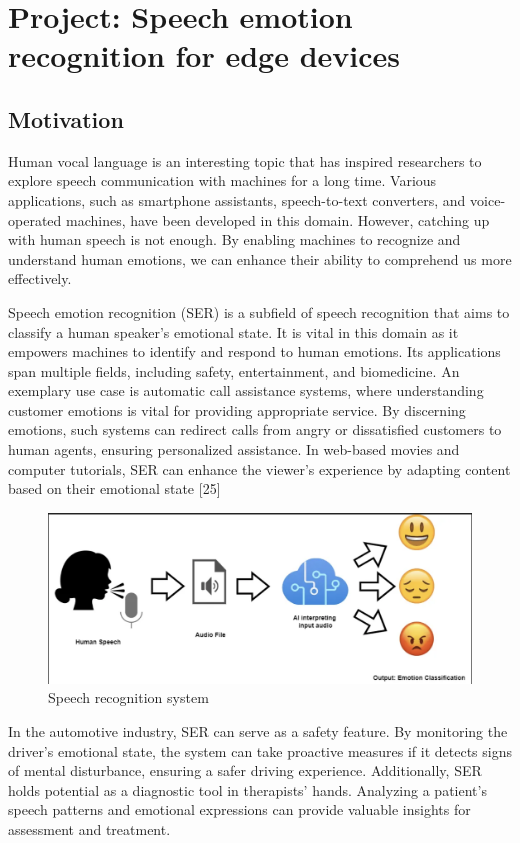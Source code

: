 \section{Project: Speech emotion recognition for edge devices}
\subsection{Motivation}
Human vocal language is an interesting topic that has inspired researchers to explore speech communication with machines for a long time. Various applications, such as smartphone assistants, speech-to-text converters, and voice-operated machines, have been developed in this domain.
However, catching up with human speech is not enough. By enabling machines to recognize and understand human emotions, we can enhance their ability to comprehend us more effectively.

Speech emotion recognition (SER) is a subfield of speech recognition that aims to classify a human speaker's emotional state. It is vital in this domain as it empowers machines to identify and respond to human emotions. Its applications span multiple fields, including safety, entertainment, and biomedicine. 
An exemplary use case is automatic call assistance systems, where understanding customer emotions is vital for providing appropriate service. By discerning emotions, such systems can redirect calls from angry or dissatisfied customers to human agents, ensuring personalized assistance.
In web-based movies and computer tutorials, SER can enhance the viewer's experience by adapting content based on their emotional state [25]

\begin{center}
    \begin{figure}[!htp]
        \centering
        \includegraphics[width=0.8 \textwidth]{image/speech_recognition.png}
        \caption{Speech recognition system}
        \label{subsection}
    \end{figure}
    \end{center}

In the automotive industry, SER can serve as a safety feature. By monitoring the driver's emotional state, the system can take proactive measures if it detects signs of mental disturbance, ensuring a safer driving experience. 
Additionally, SER holds potential as a diagnostic tool in therapists' hands. Analyzing a patient's speech patterns and emotional expressions can provide valuable insights for assessment and treatment.

